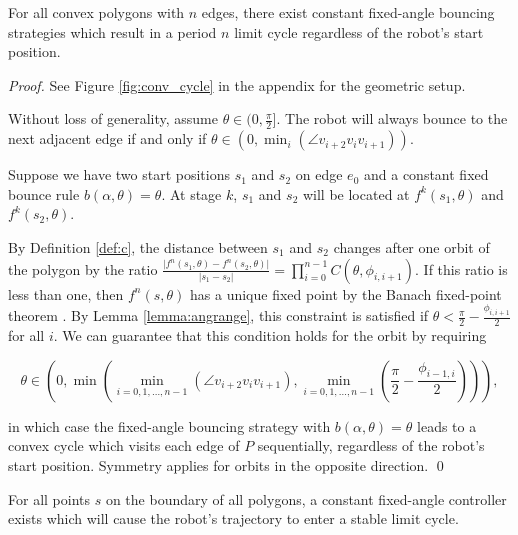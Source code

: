 \documentclass[]{styles/svproc}  %
\begin{document}
\begin{theorem} \label{thm:convex}
For all convex polygons with $n$ edges, there exist constant fixed-angle bouncing
strategies which result in a period $n$ limit cycle regardless of the robot's start position.
\end{theorem}
\begin{proof}
See Figure \ref{fig:conv_cycle} in the appendix for the geometric setup.

Without loss of generality, assume $\theta \in (0, \frac{\pi}{2}]$. The robot will always bounce
to the next adjacent edge if and only if
$\theta \in (0, \min_{i}(\angle v_{i+2}v_{i}v_{i+1}))$.

Suppose we have two start positions $s_1$ and $s_2$ on edge $e_0$ and a constant fixed bounce 
rule $b(\alpha, \theta) = \theta$.
At stage $k$, $s_1$ and $s_2$ will be located at $f^{k}(s_1,\theta)$ and
$f^{k}(s_2,\theta)$. 

By Definition \ref{def:c}, the distance between $s_1$ and $s_2$ changes after one orbit of the polygon by the
ratio $\frac{\lvert f^{n}(s_1, \theta) - f^{n}(s_2, \theta) \rvert}{ \lvert s_1
- s_2 \rvert } = \prod_{i = 0}^{n-1}
C(\theta, \phi_{i, i+1})$. If this ratio is less than one, then $f^n(s,\theta)$ has a unique fixed point by the Banach fixed-point theorem
\cite{Granas2003}. By Lemma \ref{lemma:angrange}, this constraint is satisfied if  
$\theta < \frac{\pi}{2}-\frac{\phi_{i, i+1}}{2}$ for all $i$. We can guarantee that this
condition holds for the orbit by requiring

\begin{equation*}
\theta \in (0, \min(\min_{i = 0, 1, \dots, n-1}(\angle v_{i+2}v_{i}v_{i+1}),
\min_{i = 0, 1, \dots, n-1}(\frac{\pi}{2}-\frac{\phi_{i-1, i}}{2}))),
\end{equation*}

\noindent
in which case the fixed-angle bouncing strategy with $b(\alpha, \theta) = \theta$ leads to a convex
cycle which visits each edge of $P$ sequentially, regardless of the robot's start position.
Symmetry applies for orbits in the opposite direction.
\qed

\end{proof}

\begin{proposition} \label{prop:cycle}
For all points $s$ on the boundary of all polygons, a constant
fixed-angle controller exists which will cause the robot's trajectory to enter a
stable limit cycle.
\end{proposition}
\end{document}
